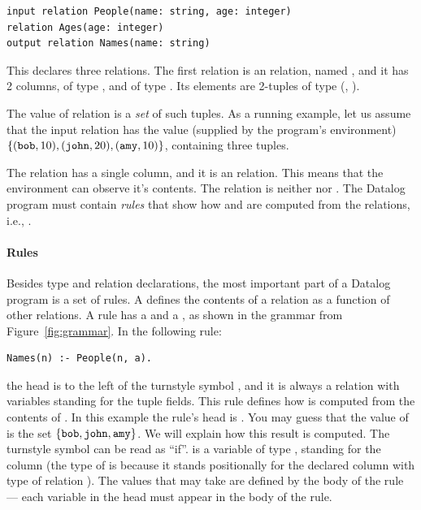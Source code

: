 \begin{lstlisting}[language=ddlog]
input relation People(name: string, age: integer)
relation Ages(age: integer)
output relation Names(name: string)
\end{lstlisting}

This declares three relations.  The first relation is an  relation, named ,
and it has 2 columns,  of type , and  of type .
Its elements are 2-tuples of type (, ).  

The value of relation  is a \emph{set} of such tuples.  As a running example,
let us assume that the input relation  has the value (supplied by the
program's environment) $\{ (\mbox{\texttt{bob}}, 10), 
(\mbox{\texttt{john}}, 20), (\mbox{\texttt{amy}}, 10) \}$, containing three tuples.  

The relation  has a single column, and it is an  relation.
This means that the environment can observe it's contents.  The relation 
is neither  nor .  The Datalog program must contain
\emph{rules} that show how  and  are
computed from the  relations, i.e., .

\paragraph{Rules}

Besides type and relation declarations, the most important part of a Datalog program is a set of rules.
A  defines the contents of a relation as a function 
of other relations.  A rule has a  and a , as shown in the
grammar from Figure~\ref{fig:grammar}.  In the following rule:

\noindent
\begin{lstlisting}[language=ddlog]
Names(n) :- People(n, a).
\end{lstlisting}

\noindent the head is to the left of the turnstyle symbol \code{:-},
and it is always a relation with variables standing for the tuple fields.
This rule defines how  is computed from the contents
of .
In this example the rule's head is .  
You may guess that the value of  is the set 
$\{ \mbox{\texttt{bob}}, \mbox{\texttt{john}}, \mbox{\texttt{amy}} \}$.  We will explain how this result is computed.
The turnstyle symbol can be read as ``if''.
 is a variable of type , standing for the column 
(the type of  is  because it stands positionally for the declared
column  with type  of relation ).
The values that  may take are defined by the body of the rule
--- each variable in the head must appear in the body of the rule.

